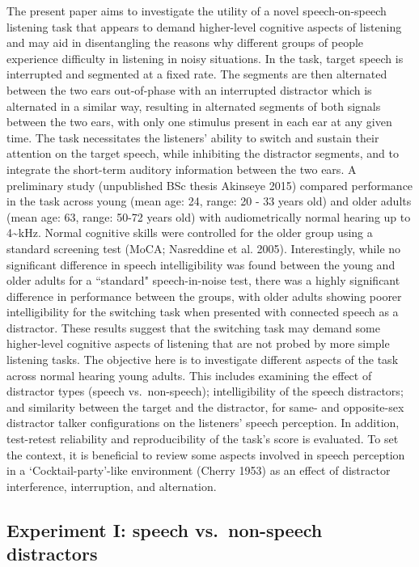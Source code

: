 \documentclass[a4paper,nobind]{templates/ociamthesis}
\begin{document}
The present paper aims to investigate the utility of a novel speech-on-speech listening task that appears to demand higher-level cognitive aspects of listening and may aid in disentangling the reasons why different groups of people experience difficulty in listening in noisy situations. In the task, target speech is interrupted and segmented at a fixed rate. The segments are then alternated between the two ears out-of-phase with an interrupted distractor which is alternated in a similar way, resulting in alternated segments of both signals between the two ears, with only one stimulus present in each ear at any given time. The task necessitates the listeners' ability to switch and sustain their attention on the target speech, while inhibiting the distractor segments, and to integrate the short-term auditory information between the two ears.
A preliminary study (unpublished BSc thesis Akinseye 2015) compared performance in the task across young (mean age: 24, range: 20 - 33 years old) and older adults (mean age: 63, range: 50-72 years old) with audiometrically normal hearing up to 4\textasciitilde kHz. Normal cognitive skills were controlled for the older group using a standard screening test (MoCA; Nasreddine et al. 2005). Interestingly, while no significant difference in speech intelligibility was found between the young and older adults for a ``standard" speech-in-noise test, there was a highly significant difference in performance between the groups, with older adults showing poorer intelligibility for the switching task when presented with connected speech as a distractor. These results suggest that the switching task may demand some higher-level cognitive aspects of listening that are not probed by more simple listening tasks.
The objective here is to investigate different aspects of the task across normal hearing young adults. This includes examining the effect of distractor types (speech vs.~non-speech); intelligibility of the speech distractors; and similarity between the target and the distractor, for same- and opposite-sex distractor talker configurations on the listeners' speech perception. In addition, test-retest reliability and reproducibility of the task's score is evaluated.
To set the context, it is beneficial to review some aspects involved in speech perception in a `Cocktail-party'-like environment (Cherry 1953) as an effect of distractor interference, interruption, and alternation.

\hypertarget{Exp1}{%
\subsection{Experiment I: speech vs.~non-speech distractors}\label{Exp1}}
\end{document}
